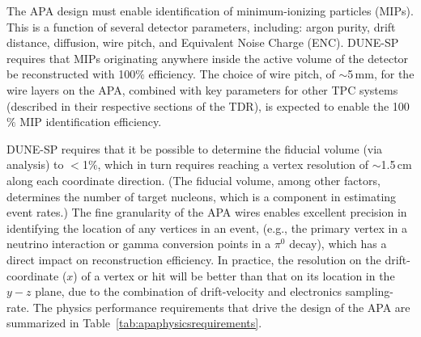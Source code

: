 The APA design must enable identification of minimum-ionizing particles (MIPs). This is a function of several detector parameters, including: argon purity, drift distance, diffusion, wire pitch, and Equivalent Noise Charge (ENC).  DUNE-SP requires that MIPs originating anywhere inside the active volume of the detector be reconstructed with 100$\%$ efficiency.   The choice of wire pitch, of $\sim$5\,mm, for the wire layers on the APA, combined with key parameters for other TPC systems (described in their respective sections of the TDR), is expected to enable the 100$\%$ MIP identification efficiency.

DUNE-SP requires that it be possible to determine the fiducial volume (via analysis) to $<$1$\%$, which in turn requires reaching a vertex resolution of $\sim$1.5\,cm along each coordinate direction. (The fiducial volume, among other factors, determines the number of target nucleons, which is a component in estimating event rates.) The fine granularity of the APA wires enables excellent precision in identifying the location of any vertices in an event, (e.g., the primary vertex in a neutrino interaction or gamma conversion points in a $\pi^{0}$ decay), which has a direct impact on reconstruction efficiency.
In practice, the resolution on the drift-coordinate ($x$) of a vertex or hit will be better than that on its location in the $y-z$ plane, due to the combination of drift-velocity and electronics sampling-rate.  The physics performance requirements that drive the design of the APA are summarized in Table~\ref{tab:apaphysicsrequirements}.  %

